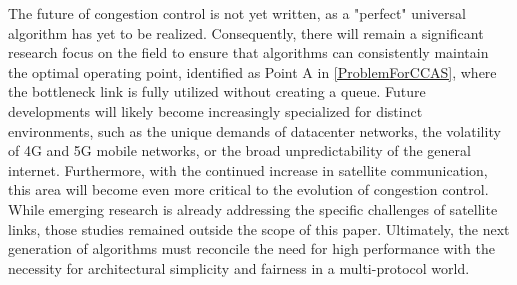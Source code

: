 \documentclass[conference]{IEEEtran}
\begin{document}
The future of congestion control is not yet written, as a "perfect" universal algorithm has yet to be realized. 
Consequently, there will remain a significant research focus on the field to ensure that algorithms can consistently maintain the optimal operating point, identified as Point A in \ref{ProblemForCCAS}, where the bottleneck link is fully utilized without creating a queue. 
Future developments will likely become increasingly specialized for distinct environments, such as the unique demands of datacenter networks, the volatility of 4G and 5G mobile networks, or the broad unpredictability of the general internet. 
Furthermore, with the continued increase in satellite communication, this area will become even more critical to the evolution of congestion control. 
While emerging research is already addressing the specific challenges of satellite links, those studies remained outside the scope of this paper. 
Ultimately, the next generation of algorithms must reconcile the need for high performance with the necessity for architectural simplicity and fairness in a multi-protocol world.
 




\end{document}
